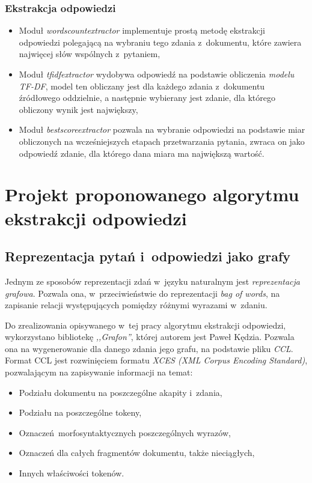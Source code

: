 \documentclass[a4paper, twoside, 12pt]{report}
\begin{document}
        \subsection{Ekstrakcja odpowiedzi}
            \begin{itemize}
                \item Moduł \emph{wordscountextractor} implementuje prostą metodę ekstrakcji odpowiedzi polegającą na
                    wybraniu tego zdania z~dokumentu, które zawiera najwięcej słów wspólnych z~pytaniem,
                \item Moduł \emph{tfidfextractor} wydobywa odpowiedź na podstawie obliczenia \emph{modelu TF-DF}, model
                    ten obliczany jest dla każdego zdania z~dokumentu źródłowego oddzielnie, a następnie wybierany
                    jest zdanie, dla którego obliczony wynik jest największy,
                \item Moduł \emph{bestscoreextractor} pozwala na wybranie odpowiedzi na podstawie miar obliczonych na
                    wcześniejszych etapach przetwarzania pytania, zwraca on jako odpowiedź zdanie, dla którego dana
                    miara ma największą wartość.
            \end{itemize}



\chapter{Projekt proponowanego algorytmu ekstrakcji odpowiedzi}
    \section{Reprezentacja pytań i~odpowiedzi jako grafy}
        Jednym ze sposobów reprezentacji zdań w~języku naturalnym jest \emph{reprezentacja grafowa}. Pozwala ona, w~przeciwieństwie
        do reprezentacji \emph{bag of words}, na zapisanie relacji występujących pomiędzy różnymi wyrazami w~zdaniu.

        Do zrealizowania opisywanego w~tej pracy algorytmu ekstrakcji odpowiedzi, wykorzystano bibliotekę \emph{,,Grafon''},
        której autorem jest Paweł Kędzia.
        Pozwala ona na wygenerowanie dla danego zdania jego grafu, na podstawie pliku \emph{CCL}. Format CCL jest
        rozwinięciem formatu \emph{XCES (XML Corpus Encoding Standard)}, pozwalającym na zapisywanie informacji na temat:
        \begin{itemize}
            \item Podziału dokumentu na poszczególne akapity i~zdania,
            \item Podziału na poszczególne tokeny,
            \item Oznaczeń morfosyntaktycznych poszczególnych wyrazów,
            \item Oznaczeń dla całych fragmentów dokumentu, także nieciągłych,
            \item Innych właściwości tokenów.
        \end{itemize}
\end{document}
